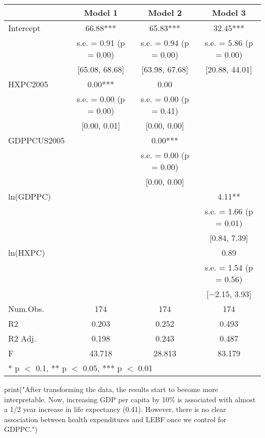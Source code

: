\documentclass[
]{article}
\newenvironment{Shaded}{\begin{snugshade}}{\end{snugshade}}
\newcommand{\FunctionTok}[1]{\textcolor[rgb]{0.00,0.00,0.00}{#1}}
\newcommand{\NormalTok}[1]{#1}
\newcommand{\StringTok}[1]{\textcolor[rgb]{0.31,0.60,0.02}{#1}}
\begin{document}
\begin{table}
\centering
\begin{tabular}[t]{lccc}
\toprule
  & Model 1 & Model 2 & Model 3\\
\midrule
Intercept & \num{66.88}*** & \num{65.83}*** & \num{32.45}***\\
 & s.e. = \num{0.91} (p = \num{0.00}) & s.e. = \num{0.94} (p = \num{0.00}) & s.e. = \num{5.86} (p = \num{0.00})\\
 & {}[\num{65.08}, \num{68.68}] & {}[\num{63.98}, \num{67.68}] & {}[\num{20.88}, \num{44.01}]\\
HXPC2005 & \num{0.00}*** & \num{0.00} & \\
 & s.e. = \num{0.00} (p = \num{0.00}) & s.e. = \num{0.00} (p = \num{0.41}) & \\
 & {}[\num{0.00}, \num{0.01}] & {}[\num{0.00}, \num{0.00}] & \\
GDPPCUS2005 &  & \num{0.00}*** & \\
 &  & s.e. = \num{0.00} (p = \num{0.00}) & \\
 &  & {}[\num{0.00}, \num{0.00}] & \\
ln(GDPPC) &  &  & \num{4.11}**\\
 &  &  & s.e. = \num{1.66} (p = \num{0.01})\\
 &  &  & {}[\num{0.84}, \num{7.39}]\\
ln(HXPC) &  &  & \num{0.89}\\
 &  &  & s.e. = \num{1.54} (p = \num{0.56})\\
 &  &  & {}[\num{-2.15}, \num{3.93}]\\
\midrule
Num.Obs. & \num{174} & \num{174} & \num{174}\\
R2 & \num{0.203} & \num{0.252} & \num{0.493}\\
R2 Adj. & \num{0.198} & \num{0.243} & \num{0.487}\\
F & \num{43.718} & \num{28.813} & \num{83.179}\\
\bottomrule
\multicolumn{4}{l}{\rule{0pt}{1em}* p $<$ 0.1, ** p $<$ 0.05, *** p $<$ 0.01}\\
\end{tabular}
\end{table}

\begin{Shaded}
\begin{Highlighting}[]
\FunctionTok{print}\NormalTok{(}\StringTok{"After transforming the data, the results start to become more interpretable. Now, increasing GDP per capita by 10\% is associated with almost a 1/2 year increase in life expectancy (0.41). However, there is no clear association between health expenditures and LEBF once we control for GDPPC."}\NormalTok{)}
\end{Highlighting}
\end{Shaded}
\end{document}
